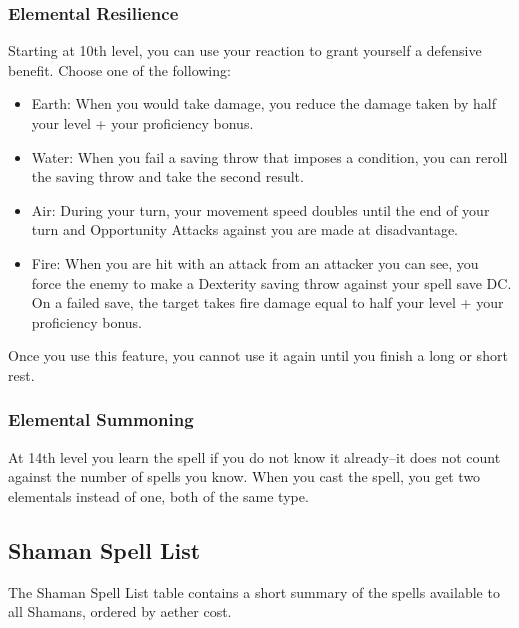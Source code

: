 \subsubsection{Elemental Resilience}
Starting at 10th level, you can use your reaction to grant yourself a defensive benefit. Choose one of the following:
\begin{itemize}
  \item Earth: When you would take damage, you reduce the damage taken by half your level + your proficiency bonus.
  \item Water: When you fail a saving throw that imposes a condition, you can reroll the saving throw and take the second result.
  \item Air: During your turn, your movement speed doubles until the end of your turn and Opportunity Attacks against you are made at disadvantage.
  \item Fire: When you are hit with an attack from an attacker you can see, you force the enemy to make a Dexterity saving throw against your spell save DC. On a failed save, the target takes fire damage equal to half your level + your proficiency bonus.
\end{itemize}

Once you use this feature, you cannot use it again until you finish a long or short rest.

\subsubsection{Elemental Summoning}
At 14th level you learn the  spell if you do not know it already--it does not count against the number of spells you know. When you cast the spell, you get two elementals instead of one, both of the same type.

\subsection{Shaman Spell List}
The Shaman Spell List table contains a short summary of the spells available to all Shamans, ordered by aether cost.

